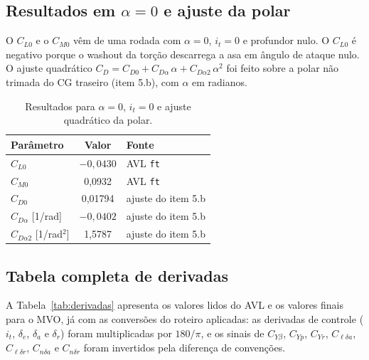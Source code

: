 \subsection*{Resultados em $\alpha = 0$ e ajuste da polar}

O $C_{L0}$ e o $C_{M0}$ vêm de uma rodada com $\alpha = 0$, $i_t = 0$ e
profundor nulo. O $C_{L0}$ é negativo porque o washout da torção descarrega
a asa em ângulo de ataque nulo. O ajuste quadrático $C_D = C_{D0} +
C_{D\alpha}\,\alpha + C_{D\alpha 2}\,\alpha^2$ foi feito sobre a polar não
trimada do CG traseiro (item 5.b), com $\alpha$ em radianos.

\begin{table}[H]
\centering
\caption{Resultados para $\alpha = 0$, $i_t = 0$ e ajuste quadrático da polar.}\label{tab:cl0_polar}
\renewcommand{\arraystretch}{1.25}
\begin{tabular}{lcl}
\toprule
Parâmetro & Valor & Fonte \\
\midrule
$C_{L0}$ & $-0{,}0430$ & AVL \texttt{ft} \\
$C_{M0}$ & 0,0932 & AVL \texttt{ft} \\
$C_{D0}$ & 0,01794 & ajuste do item 5.b \\
$C_{D\alpha}$ [1/rad] & $-0{,}0402$ & ajuste do item 5.b \\
$C_{D\alpha 2}$ [1/rad$^2$] & 1,5787 & ajuste do item 5.b \\
\bottomrule
\end{tabular}
\end{table}

\subsection*{Tabela completa de derivadas}

A Tabela~\ref{tab:derivadas} apresenta os valores lidos do AVL e os
valores finais para o MVO, já com as conversões do roteiro aplicadas: as
derivadas de controle ($i_t$, $\delta_e$, $\delta_a$ e $\delta_r$) foram
multiplicadas por $180/\pi$, e os sinais de $C_{Y\beta}$, $C_{Yp}$,
$C_{Yr}$, $C_{\ell\delta a}$, $C_{\ell\delta r}$, $C_{n\delta a}$ e
$C_{n\delta r}$ foram invertidos pela diferença de convenções.

